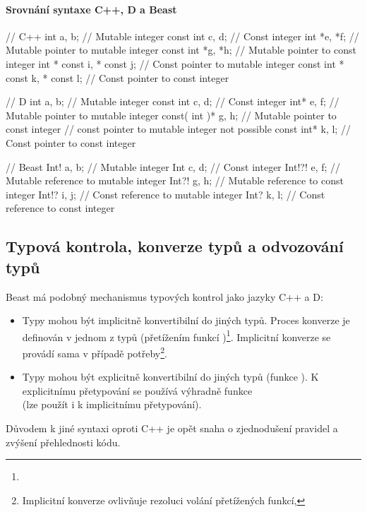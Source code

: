 \paragraph{Srovnání syntaxe C++, D a Beast}
\begin{cppcode}
	// C++
	int a, b; // Mutable integer
	const int c, d; // Const integer
	int *e, *f; // Mutable pointer to mutable integer
	const int *g, *h; // Mutable pointer to const integer
	int * const i, * const j; // Const pointer to mutable integer
	const int * const k, * const l; // Const pointer to const integer
\end{cppcode}
\begin{dcode}
	// D
	int a, b; // Mutable integer
	const int c, d; // Const integer
	int* e, f; // Mutable pointer to mutable integer
	const( int )* g, h; // Mutable pointer to const integer
	// const pointer to mutable integer not possible
	const int* k, l; // Const pointer to const integer
\end{dcode}
\begin{code}
	// Beast
	Int! a, b; // Mutable integer
	Int c, d; // Const integer
	Int!?! e, f; // Mutable reference to mutable integer
	Int?! g, h; // Mutable reference to const integer
	Int!? i, j; // Const reference to mutable integer
	Int? k, l; // Const reference to const integer
\end{code}

\subsection{Typová kontrola, konverze typů a odvozování typů}
Beast má podobný mechanismus typových kontrol jako jazyky C++ a D:
\begin{itemize}
	\item Typy mohou být implicitně konvertibilní do jiných typů. Proces konverze je definován v jednom z typů (přetížením funkcí )\footnote{}. Implicitní konverze se provádí sama v případě potřeby\footnote{Implicitní konverze ovlivňuje rezoluci volání přetížených funkcí, }.
	\item Typy mohou být explicitně konvertibilní do jiných typů (funkce ). K explicitnímu přetypování se používá výhradně funkce\\ (lze použít i k implicitnímu přetypování).
\end{itemize}

Důvodem k jiné syntaxi oproti C++ je opět snaha o zjednodušení pravidel a zvýšení přehlednosti kódu.

